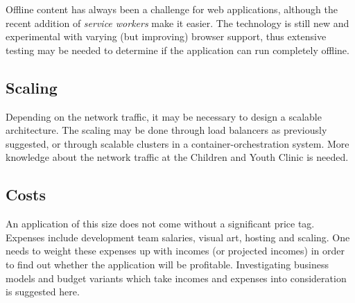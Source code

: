 Offline content has always been a challenge for web applications, although the recent addition of \emph{service workers} make it easier. The technology is still new and experimental with varying (but improving) browser support, thus extensive testing may be needed to determine if the application can run completely offline.

\subsection{Scaling}

Depending on the network traffic, it may be necessary to design a scalable architecture. The scaling may be done through load balancers as previously suggested, or through scalable clusters in a container-orchestration system. More knowledge about the network traffic at the Children and Youth Clinic is needed.

\subsection{Costs}

An application of this size does not come without a significant price tag. Expenses include development team salaries, visual art, hosting and scaling. One needs to weight these expenses up with incomes (or projected incomes) in order to find out whether the application will be profitable. Investigating business models and budget variants which take incomes and expenses into consideration is suggested here.


